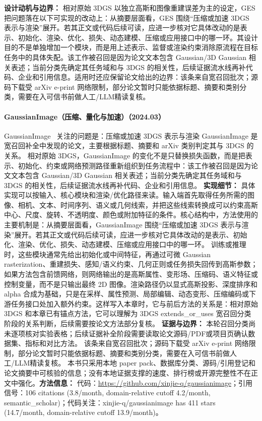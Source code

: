 \textbf{设计动机与边界：} 相对原始 3DGS 以独立高斯和图像重建误差为主的设定，GES 把问题落在以下可实现的改动上：从摘要层面看，GES 围绕“压缩或加速 3DGS 表示与渲染”展开。若其正文或代码后续可读，应进一步核对它具体改动的是表示、初始化、渲染、优化、损失、动态建模、压缩或应用接口中的哪一环。其设计目的不是单独增加一个模块，而是用上述表示、监督或渲染约束消除原流程在目标任务中的具体失配。该工作被召回是因为论文文本包含 Gaussian/3D Gaussian 相关表述；当前分类先确定其任务域和与 3DGS 的相关性，后续证据流水线再补代码、企业和引用信息。适用时还应保留论文给出的边界：该条来自宽召回批次；源码下载受 arXiv e-print 网络限制，部分论文暂时只能依据标题、摘要和类别分类，需要在入可信书前做人工/LLM精读复核。
\paragraph{GaussianImage（压缩、量化与加速）（2024.03）}
GaussianImage~\cite{2403_08551} 关注的问题是：压缩或加速 3DGS 表示与渲染 GaussianImage 是宽召回补全中发现的论文，主要根据标题、摘要和 arXiv 类别判定其与 3DGS 的关系。
相对原始 3DGS，GaussianImage 的变化不是只替换损失函数，而是把表示、初始化、约束或网络预测路径重新组织到任务流程中：该工作被召回是因为论文文本包含 Gaussian/3D Gaussian 相关表述；当前分类先确定其任务域和与 3DGS 的相关性，后续证据流水线再补代码、企业和引用信息。
\textbf{实现细节：} 具体实现可以按输入、核心模块和渲染/优化路径来读。输入端首先取得任务所需的图像、相机、文本、时间序列、语义或几何线索，并把这些线索转换成可以约束高斯中心、尺度、旋转、不透明度、颜色或附加特征的条件。核心结构中，方法使用的主要机制是：从摘要层面看，GaussianImage 围绕“压缩或加速 3DGS 表示与渲染”展开。若其正文或代码后续可读，应进一步核对它具体改动的是表示、初始化、渲染、优化、损失、动态建模、压缩或应用接口中的哪一环。 训练或推理时，这些模块通常先给出初始化或中间特征，再通过可微 Gaussian rasterization、重建损失、感知/语义约束、几何正则或任务损失回传到高斯参数；如果方法包含前馈网络，则网络输出的是高斯属性、变形场、压缩码、语义特征或控制变量，而不是只输出最终 2D 图像。渲染路径仍以显式高斯投影、深度排序和 alpha 合成为基础，只是在采样、属性预测、局部编辑、动态变形、压缩编码或下游任务接口处加入额外约束。这样写入本章时，它与前后方法的关系是：相对原始 3DGS 和本章已有锚点方法，它可以理解为 3DGS extends\_or\_uses 宽召回分类阶段的关系判断，后续需要按论文方法部分复核。
\textbf{证据与边界：} 本轮召回分类尚未逐项核对实验表格；后续证据补全阶段需要读取论文源码/PDF或项目页确认数据集、指标和对比方法。 该条来自宽召回批次；源码下载受 arXiv e-print 网络限制，部分论文暂时只能依据标题、摘要和类别分类，需要在入可信书前做人工/LLM精读复核。 本书只采用本地 paper pack、数据库分类、源码/引用登记和论文摘要中可核验的信息；没有本地证据支撑的速度、排行榜或开源完整性不在正文中强化。\textbf{方法信息：} 代码：\url{https://github.com/xinjie-q/gaussianimage}；引用信号：106 citations (3.8/month, domain-relative cutoff 4.2/month, semantic\_scholar)；代码关注：xinjie-q/gaussianimage has 411 stars (14.7/month, domain-relative cutoff 13.9/month)。
